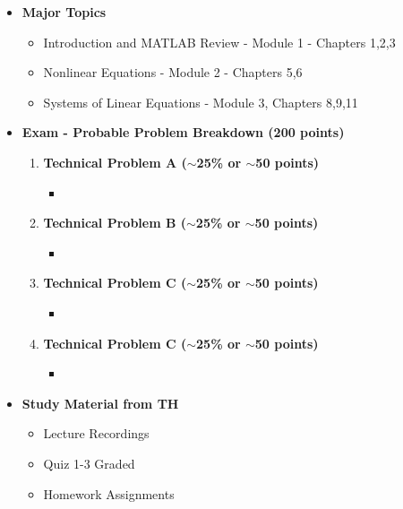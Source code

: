 \documentclass[11pt]{article}
\begin{document}
\begin{itemize}
\item\textbf{\Large Major Topics}\\
	\begin{itemize}

		\item  {\large Introduction and MATLAB Review - Module 1 - Chapters 1,2,3}
		\item  {\large Nonlinear Equations - Module 2 - Chapters 5,6}
		\item  {\large Systems of Linear Equations - Module 3, Chapters 8,9,11}

	\end{itemize}


\vspace{5mm}
\item  \textbf{\Large Exam  - Probable Problem Breakdown (200 points) }\\
\Large
	\begin{enumerate}


		\item  \textbf{\Large Technical Problem A ($\sim$25\% or $\sim$50 points)}\\
		\begin{itemize}
			\item 
		\end{itemize}
		\item  \textbf{\Large Technical Problem B ($\sim$25\% or $\sim$50 points)}\\
		\begin{itemize}
			\item 
		\end{itemize}
		\item  \textbf{\Large Technical Problem C ($\sim$25\% or $\sim$50 points)}\\
		\begin{itemize}
			\item 

		\end{itemize}
		\item  \textbf{\Large Technical Problem C ($\sim$25\% or $\sim$50 points)}\\
		\begin{itemize}
			\item 

		\end{itemize}
	\end{enumerate}

\item  \textbf{\Large Study Material from TH}\\
\begin{itemize}

\item Lecture Recordings

\item Quiz 1-3 Graded

\item Homework Assignments

\end{itemize}

\end{itemize}


	
\end{document}
